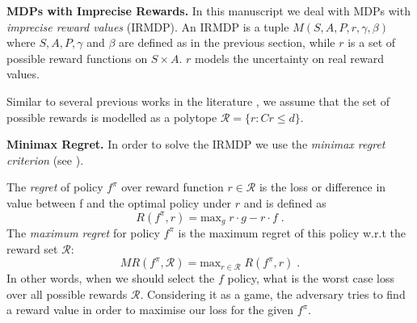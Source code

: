 \documentclass[sigconf]{aamas}  %
\begin{document}
\textbf{MDPs with Imprecise Rewards.}  
In this manuscript we deal with 
MDPs with \textit{imprecise reward values} (IRMDP). An IRMDP \citep{Regan2009} is a tuple $M(S, A, P, r, \gamma, \beta)$ where $S, A, P, \gamma$ and $\beta$ are defined as in the previous section, while $r$ is a set of possible reward functions on $S \times A$. $r$ models the uncertainty on real reward values. 

Similar to several previous works in the literature \cite{Ahmed2017,alizadeh2015,benavent2018,Regan2009,Weng2013}, we assume that the set of possible rewards is modelled as a polytope $\mathcal{R} = \{r: Cr \leq d \}$. %
 

\textbf{Minimax Regret.}  
In order to solve the IRMDP we use the \textit{minimax regret criterion} (see \cite{Regan2009,Xu2009}). 

The \textit{regret} of policy $f^{\pi}$ 
over reward function $r \in \mathcal{R}$ is the loss or difference in value between f and the optimal policy under $r$ and is defined as 
$$R(f^{\pi}, r) = \text{max}_{g} \; r \cdot g - r \cdot f\;.$$
The \textit{maximum regret} for policy $f^{\pi}$ is the maximum regret of this policy w.r.t the reward set 
$\mathcal{R}$: $$MR(f^{\pi}, \mathcal{R}) = \text{max}_{r \in \mathcal{R}}\;R(f^{\pi},r)\;.$$ 
In other words, when we should select the $f$ policy, what is the worst case loss over all possible rewards $\mathcal{R}$. Considering it as a game, the adversary tries to find a reward value in order to maximise our loss for the given $f^{\pi}$.  
\end{document}
